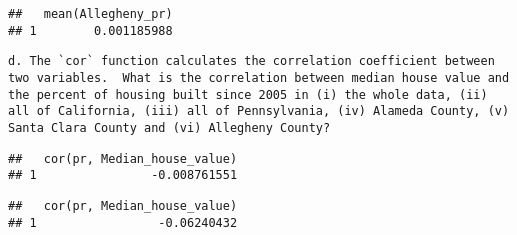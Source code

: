 \documentclass[
]{article}
\newenvironment{Shaded}{\begin{snugshade}}{\end{snugshade}}
\newcommand{\DataTypeTok}[1]{\textcolor[rgb]{0.13,0.29,0.53}{#1}}
\newcommand{\DecValTok}[1]{\textcolor[rgb]{0.00,0.00,0.81}{#1}}
\newcommand{\KeywordTok}[1]{\textcolor[rgb]{0.13,0.29,0.53}{\textbf{#1}}}
\newcommand{\NormalTok}[1]{#1}
\newcommand{\OperatorTok}[1]{\textcolor[rgb]{0.81,0.36,0.00}{\textbf{#1}}}
\newcommand{\StringTok}[1]{\textcolor[rgb]{0.31,0.60,0.02}{#1}}
\begin{document}
\begin{verbatim}
##   mean(Allegheny_pr)
## 1        0.001185988
\end{verbatim}

\begin{verbatim}
d. The `cor` function calculates the correlation coefficient between two variables.  What is the correlation between median house value and the percent of housing built since 2005 in (i) the whole data, (ii) all of California, (iii) all of Pennsylvania, (iv) Alameda County, (v) Santa Clara County and (vi) Allegheny County?
\end{verbatim}

\begin{Shaded}
\end{Shaded}

\begin{verbatim}
##   cor(pr, Median_house_value)
## 1                -0.008761551
\end{verbatim}

\begin{Shaded}
\end{Shaded}

\begin{verbatim}
##   cor(pr, Median_house_value)
## 1                 -0.06240432
\end{verbatim}

\begin{Shaded}
\end{Shaded}
\end{document}
